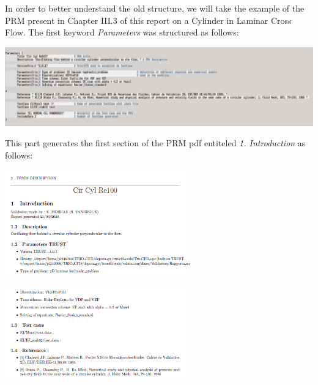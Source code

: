 In order to better understand the old structure, we will take the example of the PRM present in Chapter III.3 of
this report on a Cylinder in Laminar Cross Flow. The first keyword \textit{Parameters} was structured as follows:\newline
\begin{center}\includegraphics[width=16cm]{tools/parameters_PRM_1.png}\end{center}
\begin{center}\end{center}

This part generates the first section of the PRM pdf entiteled \textit{1. Introduction} as follows:\newline
\setlength{\columnseprule}{0.5pt}
\begin{multicols}{2}
\begin{flushleft}\includegraphics[width=8cm]{tools/parameters_PRM_1_pdf.png}\end{flushleft}
\columnbreak
\vspace{0.5cm}\begin{flushright}\includegraphics[width=8cm]{tools/parameters_PRM_2_pdf.png}\end{flushright}
\end{multicols}
\begin{center}\end{center}


